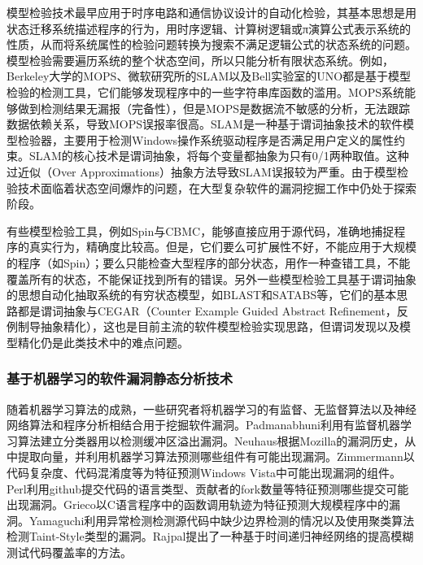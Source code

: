 模型检验技术最早应用于时序电路和通信协议设计的自动化检验，其基本思想是用状态迁移系统描述程序的行为，用时序逻辑、计算树逻辑或π演算公式表示系统的性质，从而将系统属性的检验问题转换为搜索不满足逻辑公式的状态系统的问题。模型检验需要遍历系统的整个状态空间，所以只能分析有限状态系统。例如，Berkeley大学的MOPS、微软研究所的SLAM以及Bell实验室的UNO都是基于模型检验的检测工具，它们能够发现程序中的一些字符串库函数的滥用。MOPS系统能够做到检测结果无漏报（完备性），但是MOPS是数据流不敏感的分析，无法跟踪数据依赖关系，导致MOPS误报率很高。SLAM是一种基于谓词抽象技术的软件模型检验器，主要用于检测Windows操作系统驱动程序是否满足用户定义的属性约束。SLAM的核心技术是谓词抽象，将每个变量都抽象为只有0/1两种取值。这种过近似（Over Approximations）抽象方法导致SLAM误报较为严重。由于模型检验技术面临着状态空间爆炸的问题，在大型复杂软件的漏洞挖掘工作中仍处于探索阶段。

有些模型检验工具，例如Spin与CBMC，能够直接应用于源代码，准确地捕捉程序的真实行为，精确度比较高。但是，它们要么可扩展性不好，不能应用于大规模的程序（如Spin）；要么只能检查大型程序的部分状态，用作一种查错工具，不能覆盖所有的状态，不能保证找到所有的错误。另外一些模型检验工具基于谓词抽象的思想自动化抽取系统的有穷状态模型，如BLAST和SATABS等，它们的基本思路都是谓词抽象与CEGAR（Counter Example Guided Abstract Refinement，反例制导抽象精化），这也是目前主流的软件模型检验实现思路，但谓词发现以及模型精化仍是此类技术中的难点问题。


\subsubsection{基于机器学习的软件漏洞静态分析技术}

随着机器学习算法的成熟，一些研究者将机器学习的有监督、无监督算法以及神经网络算法和程序分析相结合用于挖掘软件漏洞。Padmanabhuni利用有监督机器学习算法建立分类器用以检测缓冲区溢出漏洞。Neuhaus根据Mozilla的漏洞历史，从中提取向量，并利用机器学习算法预测哪些组件有可能出现漏洞。Zimmermann以代码复杂度、代码混淆度等为特征预测Windows Vista中可能出现漏洞的组件。Perl利用github提交代码的语言类型、贡献者的fork数量等特征预测哪些提交可能出现漏洞。Grieco以C语言程序中的函数调用轨迹为特征预测大规模程序中的漏洞。Yamaguchi利用异常检测检测源代码中缺少边界检测的情况以及使用聚类算法检测Taint-Style类型的漏洞。Rajpal提出了一种基于时间递归神经网络的提高模糊测试代码覆盖率的方法。


